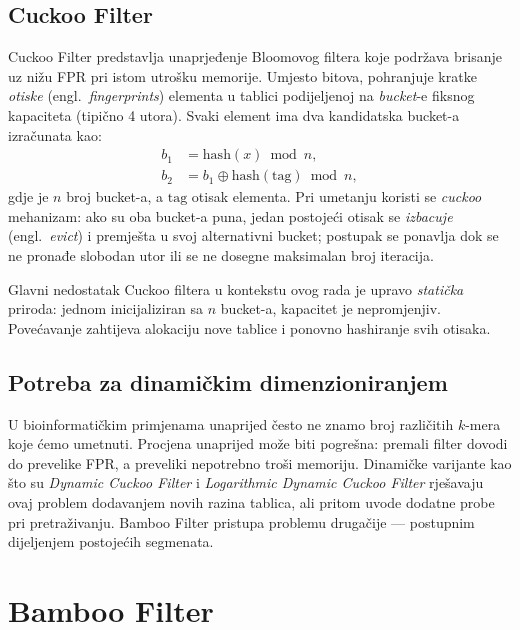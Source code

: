 \documentclass[12pt,a4paper]{article}
\begin{document}
\subsection{Cuckoo Filter}
Cuckoo Filter \cite{fan2014cuckoo} predstavlja unaprjeđenje Bloomovog filtera koje
podržava brisanje uz nižu FPR pri istom utrošku memorije. Umjesto bitova,
pohranjuje kratke \emph{otiske} (engl.~\textit{fingerprints}) elementa u tablici
podijeljenoj na \emph{bucket}-e fiksnog kapaciteta (tipično 4 utora). Svaki element
ima dva kandidatska bucket-a izračunata kao:
\begin{align}
    b_1 &= \mathrm{hash}(x) \bmod n, \label{eq:b1}\\
    b_2 &= b_1 \oplus \mathrm{hash}(\mathrm{tag}) \bmod n, \label{eq:b2}
\end{align}
gdje je $n$ broj bucket-a, a $\mathrm{tag}$ otisak elementa. Pri umetanju koristi se
\emph{cuckoo} mehanizam: ako su oba bucket-a puna, jedan postojeći otisak se
\emph{izbacuje} (engl.~\textit{evict}) i premješta u svoj alternativni bucket; postupak
se ponavlja dok se ne pronađe slobodan utor ili se ne dosegne maksimalan broj iteracija.

Glavni nedostatak Cuckoo filtera u kontekstu ovog rada je upravo \emph{statička}
priroda: jednom inicijaliziran sa $n$ bucket-a, kapacitet je nepromjenjiv. Povećavanje
zahtijeva alokaciju nove tablice i ponovno hashiranje svih otisaka.

\subsection{Potreba za dinamičkim dimenzioniranjem}
U bioinformatičkim primjenama unaprijed često ne znamo broj različitih $k$-mera koje
ćemo umetnuti. Procjena unaprijed može biti pogrešna: premali filter dovodi do prevelike
FPR, a preveliki nepotrebno troši memoriju. Dinamičke varijante kao što su
\emph{Dynamic Cuckoo Filter} \cite{chen2017dynamic} i \emph{Logarithmic Dynamic Cuckoo
Filter} \cite{zhang2021ldcf} rješavaju ovaj problem dodavanjem novih razina tablica,
ali pritom uvode dodatne probe pri pretraživanju. Bamboo Filter pristupa problemu
drugačije --- postupnim dijeljenjem postojećih segmenata.

\section{Bamboo Filter}
\label{sec:bamboo}
\end{document}
